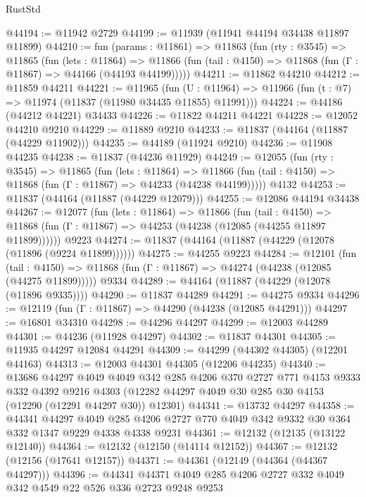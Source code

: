 \begin{lexlean}{RustStd}
\begin{coremodule}
{\begin{coremodule}
{{{{{{{{{{{{{{{{{{{{{{{{{{{{{{{{{{{{{{{{{{{{{{{{{{@44194 := @11942 @2729
@44199 := @11939 (@11941 @44194 @34438 @11897 @11899)
@44210 := fun (params : @11861) =>
  @11863
    (fun (rty : @3545) =>
    @11865
      (fun (lets : @11864) =>
      @11866 (fun (tail : @4150) => @11868 (fun (Γ : @11867) => @44166 (@44193 @44199)))))
@44211 := @11862 @44210
@44212 := @11859 @44211
@44221 := @11965
    (fun (U : @11964) => @11966 (fun (t : @7) => @11974 (@11837 (@11980 @34435 @11855) @11991)))
@44224 := @44186 (@44212 @44221) @34433
@44226 := @11822 @44211 @44221
@44228 := @12052 @44210 @9210
@44229 := @11889 @9210
@44233 := @11837 (@44164 (@11887 (@44229 @11902)))
@44235 := @44189 (@11924 @9210)
@44236 := @11908 @44235
@44238 := @11837 (@44236 @11929)
@44249 := @12055
    (fun (rty : @3545) =>
    @11865
      (fun (lets : @11864) =>
      @11866 (fun (tail : @4150) => @11868 (fun (Γ : @11867) => @44233 (@44238 @44199)))))
    @4132
@44253 := @11837 (@44164 (@11887 (@44229 @12079)))
@44255 := @12086 @44194 @34438
@44267 := @12077
    (fun (lets : @11864) =>
    @11866
      (fun (tail : @4150) =>
      @11868 (fun (Γ : @11867) => @44253 (@44238 (@12085 (@44255 @11897 @11899))))))
    @9223
@44274 := @11837 (@44164 (@11887 (@44229 (@12078 (@11896 (@9224 @11899))))))
@44275 := @44255 @9223
@44284 := @12101
    (fun (tail : @4150) => @11868 (fun (Γ : @11867) => @44274 (@44238 (@12085 (@44275 @11899)))))
    @9334
@44289 := @44164 (@11887 (@44229 (@12078 (@11896 @9335))))
@44290 := @11837 @44289
@44291 := @44275 @9334
@44296 := @12119 (fun (Γ : @11867) => @44290 (@44238 (@12085 @44291)))
@44297 := @16801 @34310
@44298 := @44296 @44297
@44299 := @12003 @44289
@44301 := @44236 (@11928 @44297)
@44302 := @11837 @44301
@44305 := @11935 @44297 @12084 @44291
@44309 := @44299 (@44302 @44305) (@12201 @44163)
@44313 := @12003 @44301 @44305 (@12206 @44235)
@44340 := @13686
    @44297
    @4049
    @4049
    @342
    @285
    @4206
    @370
    @2727
    @771
    @4153
    @9333
    @332
    @4392
    @9216
    @4303
    (@12282 @44297 @4049 @30 @285 @30 @4153 (@12290 (@12291 @44297 @30)) @12301)
@44341 := @13732 @44297
@44358 := @44341
    @44297
    @4049
    @285
    @4206
    @2727
    @770
    @4049
    @342
    @9332
    @30
    @364
    @332
    @1347
    @9229
    @4338
    @4338
    @9231
@44361 := @12132 (@12135 (@13122 @12140))
@44364 := @12132 (@12150 (@14114 @12152))
@44367 := @12132 (@12156 (@17641 @12157))
@44371 := @44361 (@12149 (@44364 (@44367 @44297)))
@44396 := @44341
    @44371
    @4049
    @285
    @4206
    @2727
    @332
    @4049
    @342
    @4549
    @22
    @526
    @336
    @2723
    @9248
    @9253
}}}}}}}}}}}}}}}}}}}}}}}}}}}}}}}}}}}}}}}}}}}}}}}}}}
\end{coremodule}}
\end{coremodule}
\end{lexlean}
